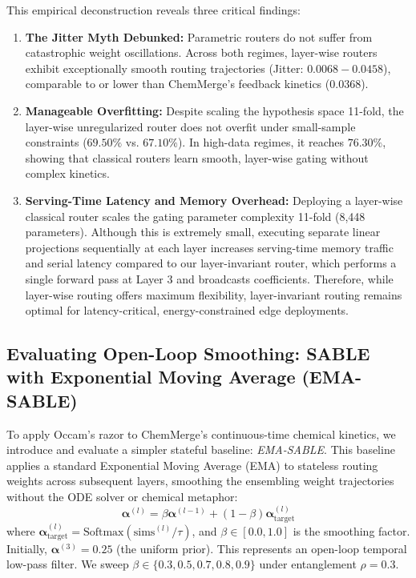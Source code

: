 This empirical deconstruction reveals three critical findings:
\begin{enumerate}
    \item \textbf{The Jitter Myth Debunked:} Parametric routers do not suffer from catastrophic weight oscillations. Across both regimes, layer-wise routers exhibit exceptionally smooth routing trajectories (Jitter: $0.0068 - 0.0458$), comparable to or lower than ChemMerge's feedback kinetics ($0.0368$).
    \item \textbf{Manageable Overfitting:} Despite scaling the hypothesis space 11-fold, the layer-wise unregularized router does not overfit under small-sample constraints ($69.50\%$ vs. $67.10\%$). In high-data regimes, it reaches $76.30\%$, showing that classical routers learn smooth, layer-wise gating without complex kinetics.
    \item \textbf{Serving-Time Latency and Memory Overhead:} Deploying a layer-wise classical router scales the gating parameter complexity 11-fold (8,448 parameters). Although this is extremely small, executing separate linear projections sequentially at each layer increases serving-time memory traffic and serial latency compared to our layer-invariant router, which performs a single forward pass at Layer 3 and broadcasts coefficients. Therefore, while layer-wise routing offers maximum flexibility, layer-invariant routing remains optimal for latency-critical, energy-constrained edge deployments.
\end{enumerate}

\subsection{Evaluating Open-Loop Smoothing: SABLE with Exponential Moving Average (EMA-SABLE)}
\label{subsec:ema_sable}

To apply Occam's razor to ChemMerge's continuous-time chemical kinetics, we introduce and evaluate a simpler stateful baseline: \emph{EMA-SABLE}. This baseline applies a standard Exponential Moving Average (EMA) to stateless routing weights across subsequent layers, smoothing the ensembling weight trajectories without the ODE solver or chemical metaphor:
\begin{equation}
\boldsymbol{\alpha}^{(l)} = \beta \boldsymbol{\alpha}^{(l-1)} + (1 - \beta) \boldsymbol{\alpha}_{\text{target}}^{(l)}
\end{equation}
where $\boldsymbol{\alpha}_{\text{target}}^{(l)} = \text{Softmax}\left( \text{sims}^{(l)} / \tau \right)$, and $\beta \in [0.0, 1.0]$ is the smoothing factor. Initially, $\boldsymbol{\alpha}^{(3)} = \mathbf{0.25}$ (the uniform prior). This represents an open-loop temporal low-pass filter. We sweep $\beta \in \{0.3, 0.5, 0.7, 0.8, 0.9\}$ under entanglement $\rho=0.3$.

